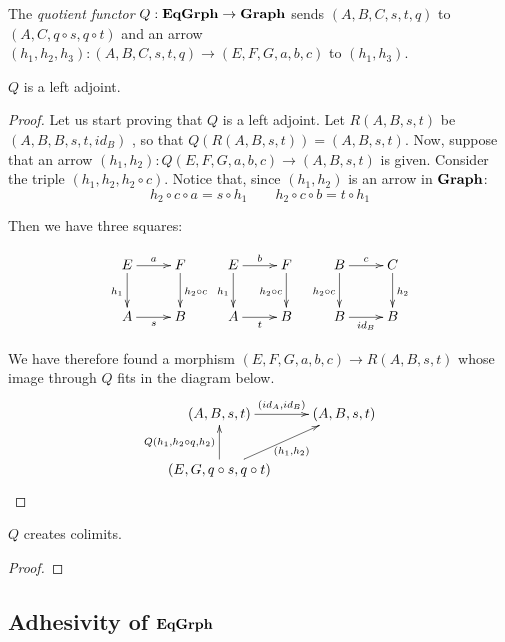 \begin{definition}
The \emph{quotient functor} $Q:\mathbf{EqGrph}\to \mathbf{Graph} $ sends $(A, B, C, s,t, q)$ to $(A, C, q\circ s, q\circ t)$ and an arrow $(h_1, h_2, h_3) \colon (A, B, C, s,t, q)\to (E, F, G, a,b, c)$ to $(h_1, h_3)$.
\end{definition}


\begin{lemma}
	$Q$ is a left  adjoint.
\end{lemma}
\begin{proof} Let us start proving that $Q$ is a left adjoint. Let $R(A,B, s, t)$ be $(A, B, B, s,t, id_{B})$ , so that $Q(R(A,B,s,t))=(A,B,s,t)$. Now, suppose that an arrow $(h_1, h_2)\colon Q(E,F,G, a,b,c)\to (A,B, s,t)$ is given. Consider the triple $(h_1, h_2, h_2\circ c)$. Notice that, since $(h_1, h_2)$ is an arrow in $\mathbf{Graph}$:
	\[h_2\circ c\circ a= s\circ h_1 \qquad  h_2\circ c\circ b= t\circ h_1\]
	
	 Then we have three squares:	
	

\[\xymatrix{E \ar[r]^{a} \ar[d]_{h_1} & F \ar[d]^{h_2\circ c} & E \ar[r]^{b} \ar[d]_{h_1}& F \ar[d]_{h_2\circ c} & B \ar[d]_{h_2\circ c} \ar[r]^{c} & C \ar[d]^{h_2}\\A \ar[r]_{s} & B & A  \ar[r]_{t}& B & B \ar[r]_{id_B} & B}\]
	
	 We have therefore found a morphism $(E,F,G, a,b,c)\to R(A,B,s,t)$ whose image through $Q$ fits in the diagram below.
	\[\xymatrix{(A, B, s,t)\ar[r]^{(id_A, id_B)} &(A, B, s,t)\\ (E, G, q\circ s, q\circ t) \ar[ur]_{(h_1, h_2)} \ar[u]^{Q(h_1, h_2\circ q, h_2)}}\]
	
\end{proof}



\begin{prop}
	$Q$ creates colimits.
\end{prop}
\begin{proof}
\end{proof}

\subsection{Adhesivity of $\mathbf{EqGrph}$}

